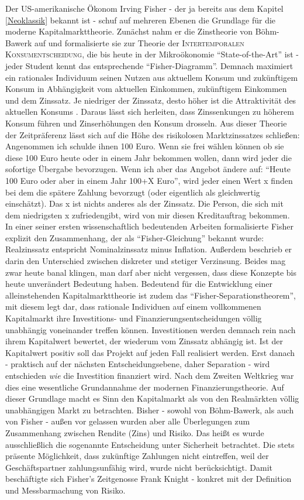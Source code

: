 Der US-amerikanische Ökonom Irving Fisher - der ja bereits aus dem Kapitel \ref{Neoklassik} bekannt ist - schuf auf mehreren Ebenen die Grundlage für die moderne Kapitalmarkttheorie. Zunächst nahm er die Zinstheorie von Böhm-Bawerk auf und formalisierte sie zur Theorie der \textsc{Intertemporalen Konsumentscheidung}, die bis heute in der Mikroökonomie "`State-of-the-Art"' ist - jeder Student kennt das entsprechende "`Fisher-Diagramm"'. Demnach maximiert ein rationales Individuum seinen Nutzen aus aktuellem Konsum und zukünftigem Konsum in Abhängigkeit vom aktuellen Einkommen, zukünftigem Einkommen und dem Zinssatz. Je niedriger der Zinssatz, desto höher ist die Attraktivität des aktuellen Konsums \parencite{Fisher1930}. Daraus lässt sich herleiten, dass Zinssenkungen zu höherem Konsum führen und Zinserhöhungen den Konsum drosseln. Aus dieser Theorie der Zeitpräferenz lässt sich auf die Höhe des risikolosen Marktzinssatzes schließen: Angenommen ich schulde ihnen 100 Euro. Wenn sie frei wählen können ob sie diese 100 Euro heute oder in einem Jahr bekommen wollen, dann wird jeder die sofortige Übergabe bevorzugen. Wenn ich aber das Angebot ändere auf: "`Heute 100 Euro oder aber in einem Jahr 100+X Euro"', wird jeder einen Wert x finden bei dem die spätere Zahlung bevorzugt (oder eigentlich als gleichwertig einschätzt). Das x ist nichts anderes als der Zinssatz. Die Person, die sich mit dem niedrigsten x zufriedengibt, wird von mir diesen Kreditauftrag bekommen. In einer seiner ersten wissenschaftlich bedeutenden Arbeiten formalisierte Fisher explizit den Zusammenhang, der als "`Fisher-Gleichung"' bekannt wurde: Realzinssatz entspricht Nominalzinssatz minus Inflation. Außerdem beschrieb er darin den Unterschied zwischen diskreter und stetiger Verzinsung\parencite[S. 191ff]{Fisher1906}. Beides mag zwar heute banal klingen, man darf aber nicht vergessen, dass diese Konzepte bis heute unverändert Bedeutung haben. Bedeutend für die Entwicklung einer alleinstehenden Kapitalmarkttheorie ist zudem das "`Fisher-Separationstheorem"', mit diesem legt \textcite[S. 125f]{Fisher1930} dar, dass rationale Individuen auf einem vollkommenen Kapitalmarkt ihre Investitions- und Finanzierungsentscheidungen völlig unabhängig voneinander treffen können. Investitionen werden demnach rein nach ihrem Kapitalwert bewertet, der wiederum vom Zinssatz abhängig ist. Ist der Kapitalwert positiv soll das Projekt auf jeden Fall realisiert werden. Erst danach - praktisch auf der nächsten Entscheidungsebene, daher Separation - wird entschieden \textit{wie} die Investition finanziert wird. Nach dem Zweiten Weltkrieg war dies eine wesentliche Grundannahme der modernen Finanzierungstheorie. Auf dieser Grundlage macht es Sinn den Kapitalmarkt als von den Realmärkten völlig unabhängigen Markt zu betrachten. Bisher - sowohl von Böhm-Bawerk, als auch von Fisher - außen vor gelassen wurden aber alle Überlegungen zum Zusammenhang zwischen Rendite (Zins) und Risiko. Das heißt es wurde ausschließlich die sogenannte Entscheidung unter Sicherheit betrachtet. Die stets präsente Möglichkeit, dass zukünftige Zahlungen nicht eintreffen, weil der Geschäftspartner zahlungsunfähig wird, wurde nicht berücksichtigt. Damit beschäftigte sich Fisher's Zeitgenosse Frank Knight - konkret mit der Definition und Messbarmachung von Risiko.

